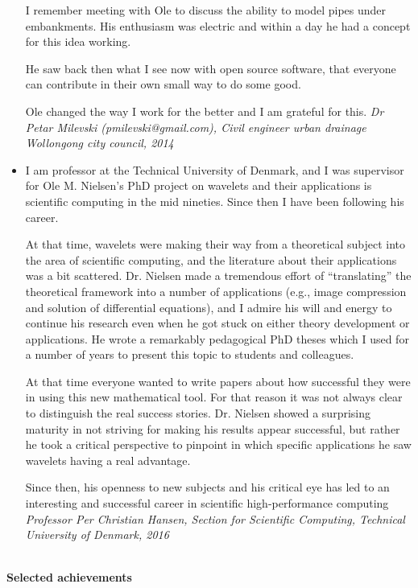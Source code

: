\documentclass[11pt,a4paper]{article}
\begin{document}
\begin{itemize}
I remember meeting with Ole to discuss the ability to model pipes under embankments. His enthusiasm was electric and within a day he had a concept for this idea working.

He saw back then what I see now with open source software, that everyone can contribute in their own small way to do some good.

Ole changed the way I work for the better and I am grateful for this.
  \emph{Dr Petar Milevski (pmilevski@gmail.com), Civil engineer urban drainage Wollongong city council, 2014}


\item I am professor at the Technical University of Denmark, and I was supervisor for Ole M. Nielsen’s PhD project on wavelets and their applications is scientific computing in the mid nineties.  Since then I have been following his career.
 
At that time, wavelets were making their way from a theoretical subject into the area of scientific computing, and the literature about their applications was a bit scattered.  Dr. Nielsen made a tremendous effort of “translating” the theoretical framework into a number of applications (e.g., image compression and solution of differential equations), and I admire his will and energy to continue his research even when he got stuck on either theory development or applications.  He wrote a remarkably pedagogical PhD theses which I used for a number of years to present this topic to students and colleagues.
 
At that time everyone wanted to write papers about how successful they were in using this new mathematical tool.  For that reason it was not always clear to distinguish the real success stories.  Dr. Nielsen showed a surprising maturity in not striving for making his results appear successful, but rather he took a critical perspective to pinpoint in which specific applications he saw wavelets having a real advantage.
 
Since then, his openness to new subjects and his critical eye has led to an interesting and successful career in scientific high-performance computing
\emph{Professor Per Christian Hansen, Section for Scientific Computing, Technical University of Denmark, 2016}

\end{itemize}


\begin{center}
  \hrulefill \\
  {\bf Selected achievements} \\[-0.2cm]
  \hrulefill
\end{center}
\end{document}
